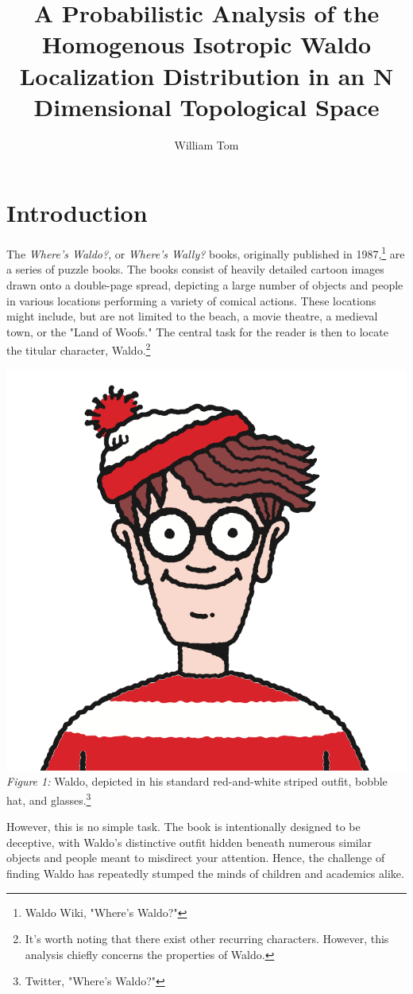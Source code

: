 \documentclass{article}
\title{\vspace{-2.0cm}A Probabilistic Analysis of the Homogenous Isotropic Waldo Localization Distribution in an N Dimensional Topological Space}
\author{William Tom}
\date{}
\begin{document}
\maketitle
\section{Introduction}
The \emph{Where's Waldo?}, or \emph{Where's Wally?} books, originally published in 1987,\footnote{Waldo Wiki, "Where's Waldo?"} are a series of puzzle books. The books consist of heavily detailed cartoon images drawn onto a double-page spread, depicting a large number of objects and people in various locations performing a variety of comical actions. These locations might include, but are not limited to the beach, a movie theatre, a medieval town, or the "Land of Woofs." The central task for the reader is then to locate the titular character, Waldo.\footnote{It's worth noting that there exist other recurring characters. However, this analysis chiefly concerns the properties of Waldo.}
\begin{center}
	\includegraphics[scale=.1]{waldo.png}\\
	\emph{Figure 1:} Waldo, depicted in his standard red-and-white striped outfit, bobble hat, and glasses.\footnote{Twitter, "Where's Waldo?"}
\end{center}
However, this is no simple task. The book is intentionally designed to be deceptive, with Waldo's distinctive outfit hidden beneath numerous similar objects and people meant to misdirect your attention. Hence, the challenge of finding Waldo has repeatedly stumped the minds of children and academics alike. 
\end{document}
